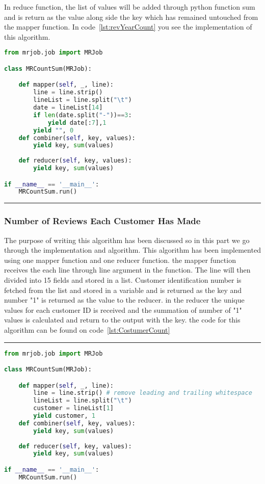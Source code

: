 In reduce function, the list of values will be added through python function sum and is return as the value along side the key which has remained untouched from the mapper function. In code~\ref{lst:revYearCount} you see the implementation of this algorithm.




\renewcommand{\lstlistingname}{Code}
\lstset{style=mystyle}
\begin{lstlisting}[language=Python, caption={Number of Reviews Each Year}, label={lst:revYearCount}, mathescape = true, breaklines=true]
from mrjob.job import MRJob

class MRCountSum(MRJob):

    def mapper(self, _, line):
        line = line.strip()  
        lineList = line.split("\t")
        date = lineList[14]
        if len(date.split("-"))==3:
            yield date[:7],1
        yield "", 0
    def combiner(self, key, values):
        yield key, sum(values)
        
    def reducer(self, key, values):
        yield key, sum(values)

if __name__ == '__main__':
    MRCountSum.run()
\end{lstlisting}

\rule{200 pt}{0.5 pt} 


\subsubsection{Number of Reviews Each Customer Has Made}
The purpose of writing this algorithm has been discussed so in this part we go through the implementation and algorithm. This algorithm has been implemented using one mapper function and one reducer function. the mapper function receives the each line through line argument in the function. The line will then divided into 15 fields and stored in a list. Customer identification number is fetched from the list and stored in a variable and is returned as the key and number "1" is returned as the value to the reducer. in the reducer the unique values for each customer ID is received and the summation of number of "1" values is calculated and return to the output with the key. the code for this algorithm can be found on code~\ref{lst:CostumerCount} 

\rule{200 pt}{0.5 pt} 

\renewcommand{\lstlistingname}{Code}
\lstset{style=mystyle}
\begin{lstlisting}[language=Python, caption={Number of Reviews Each Customer Has Made}, label={lst:CostumerCount}, mathescape = true, breaklines=true]
from mrjob.job import MRJob

class MRCountSum(MRJob):

    def mapper(self, _, line):
        line = line.strip() # remove leading and trailing whitespace
        lineList = line.split("\t")
        customer = lineList[1]
        yield customer, 1
    def combiner(self, key, values):
        yield key, sum(values)
        
    def reducer(self, key, values):
        yield key, sum(values)

if __name__ == '__main__':
    MRCountSum.run()
\end{lstlisting}


